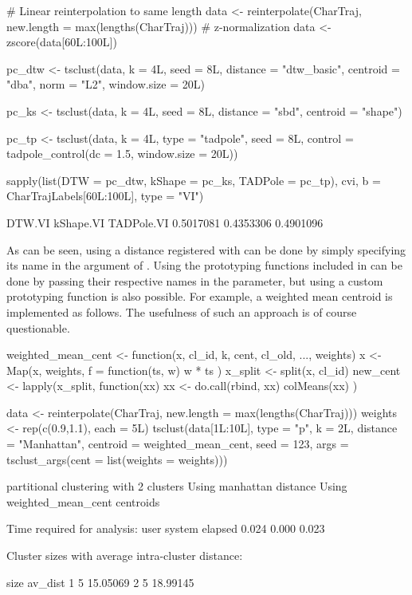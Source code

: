 \begin{example}
# Linear reinterpolation to same length
data <- reinterpolate(CharTraj, new.length = max(lengths(CharTraj)))
# z-normalization
data <- zscore(data[60L:100L])

pc_dtw <- tsclust(data, k = 4L, seed = 8L,
                  distance = "dtw_basic", centroid = "dba",
                  norm = "L2", window.size = 20L)

pc_ks <- tsclust(data, k = 4L, seed = 8L,
                 distance = "sbd", centroid = "shape")

pc_tp <- tsclust(data, k = 4L, type = "tadpole", seed = 8L,
                 control = tadpole_control(dc = 1.5, window.size = 20L))

sapply(list(DTW = pc_dtw, kShape = pc_ks, TADPole = pc_tp),
       cvi, b = CharTrajLabels[60L:100L], type = "VI")

   DTW.VI  kShape.VI TADPole.VI
0.5017081  0.4353306  0.4901096
\end{example}

As can be seen, using a distance registered with  can be done by simply specifying its name in the  argument of .
Using the prototyping functions included in \dtwclust{} can be done by passing their respective names in the  parameter,
but using a custom prototyping function is also possible.
For example, a weighted mean centroid is implemented as follows.
The usefulness of such an approach is of course questionable.

\begin{example}
weighted_mean_cent <- function(x, cl_id, k, cent, cl_old, ..., weights) {
    x <- Map(x, weights, f = function(ts, w) { w * ts })
    x_split <- split(x, cl_id)
    new_cent <- lapply(x_split, function(xx) {
        xx <- do.call(rbind, xx)
        colMeans(xx)
    })
}

data <- reinterpolate(CharTraj, new.length = max(lengths(CharTraj)))
weights <- rep(c(0.9,1.1), each = 5L)
tsclust(data[1L:10L], type = "p", k = 2L,
        distance = "Manhattan",
        centroid = weighted_mean_cent,
        seed = 123,
        args = tsclust_args(cent = list(weights = weights)))

partitional clustering with 2 clusters
Using manhattan distance
Using weighted_mean_cent centroids

Time required for analysis:
user  system elapsed
0.024   0.000   0.023

Cluster sizes with average intra-cluster distance:

size  av_dist
1    5 15.05069
2    5 18.99145
\end{example}

